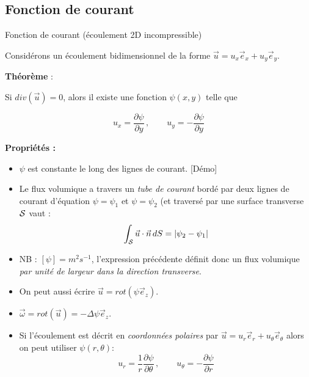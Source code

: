 \subsection{Fonction de courant}
\begin{frame}{Fonction de courant (écoulement 2D incompressible)}

Considérons un écoulement bidimensionnel de la forme $\vec{u} = u_x \vec{e}_x +   u_y \vec{e}_y$.

\smallskip

{\bf Théorème } : 

Si $div(\vec u) = 0$, alors il existe une fonction $\psi(x,y)$ telle que 

$$
u_x = \frac{\partial \psi}{\partial y}  \, , \qquad u_y =  - \frac{\partial \psi}{\partial y} 
$$

\pause \medskip
{\bf Propriétés :}
\begin{itemize}
\item $\psi$ est constante le long des lignes de courant. {\color{vert} [Démo] }
\item Le flux volumique a travers un {\em tube de courant} bordé par deux lignes de courant d'équation $\psi = \psi_1$ et $\psi = \psi_2$
(et traversé par une surface transverse $\cal S$ vaut :
$$ \int_{\cal S}  \vec{u} \cdot  \vec {n} \, dS = \left| \psi_2 - \psi_1 \right| $$
\item[] NB : $[\psi] = m^2 s^{-1}$, l'expression précédente définit donc un flux volumique {\em par unité de largeur dans la direction transverse}.

\item On peut aussi écrire ${\vec u } = rot ( \psi \vec{e}_z)$.
\item $\vec{\omega} = rot ( \vec{u}) = - \Delta \psi \vec{e}_z$.


\item Si l'écoulement est décrit en {\em coordonnées polaires } par $\vec{u} = u_r \vec{e}_r +   u_\theta \vec{e}_\theta$ alors on peut utiliser $\psi(r,\theta)$:
$$
u_r = \frac{1}{r} \frac{\partial \psi}{\partial \theta}  \, , \qquad u_\theta =  - \frac{\partial \psi}{\partial r} 
$$



\end{itemize}
\end{frame}


